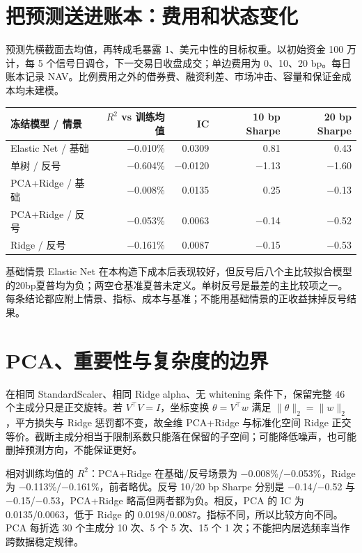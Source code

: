 \clearpage\section{把预测送进账本：费用和状态变化}
\begin{strand}
预测先横截面去均值，再转成毛暴露 1、美元中性的目标权重。以初始资金 100 万计，每 5 个信号日调仓，下一交易日收盘成交；单边费用为 0、10、20 bp。每日账本记录 NAV。比例费用之外的借券费、融资利差、市场冲击、容量和保证金成本均未建模。
\end{strand}
\begin{center}\small
\begin{tabular}{lrrrr}
\toprule
冻结模型 / 情景 & \(R^2\) vs 训练均值 & IC & 10 bp Sharpe & 20 bp Sharpe\\
\midrule
Elastic Net / 基础 & −0.010\% & 0.0309 & 0.81 & 0.43\\
单树 / 反号 & −0.604\% & −0.0120 & −1.13 & −1.60\\
PCA+Ridge / 基础 & −0.008\% & 0.0135 & 0.25 & −0.13\\
PCA+Ridge / 反号 & −0.053\% & 0.0063 & −0.14 & −0.52\\
Ridge / 反号 & −0.161\% & 0.0087 & −0.15 & −0.53\\
\bottomrule
\end{tabular}
\end{center}
基础情景 Elastic Net 在本构造下成本后表现较好，但反号后八个主比较拟合模型的20bp夏普均为负；两空仓基准夏普未定义。单树反号是最差的主比较项之一。每条结论都应附上情景、指标、成本与基准；不能用基础情景的正收益抹掉反号结果。


\clearpage\section{PCA、重要性与复杂度的边界}
\begin{proposition}
在相同 StandardScaler、相同 Ridge alpha、无 whitening 条件下，保留完整 46 个主成分只是正交旋转。若 \(V^\top V=I\)，坐标变换 \(\theta=V^\top w\) 满足 \(\|\theta\|_2=\|w\|_2\)，平方损失与 Ridge 惩罚都不变，故全维 PCA+Ridge 与标准化空间 Ridge 正交等价。截断主成分相当于限制系数只能落在保留的子空间；可能降低噪声，也可能删掉预测方向，不能保证更好。
\end{proposition}
相对训练均值的 \(R^2\)：PCA+Ridge 在基础/反号场景为 −0.008\%/−0.053\%，Ridge 为 −0.113\%/−0.161\%，前者略优。反号 10/20 bp Sharpe 分别是 −0.14/−0.52 与 −0.15/−0.53，PCA+Ridge 略高但两者都为负。相反，PCA 的 IC 为 0.0135/0.0063，低于 Ridge 的 0.0198/0.0087。指标不同，所以比较方向不同。PCA 每折选 30 个主成分 10 次、5 个 5 次、15 个 1 次；不能把内层选频率当作跨数据稳定规律。

